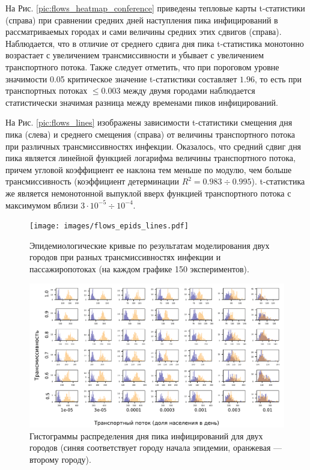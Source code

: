 \documentclass[a4paper,12pt]{article} %
\begin{document}
На Рис. \ref{pic:flows_heatmap_conference} приведены тепловые карты t-статистики (справа) при сравнении средних дней наступления пика инфицирований в рассматриваемых городах и сами величины средних этих сдвигов (справа). Наблюдается, что в отличие от среднего сдвига дня пика t-статистика монотонно возрастает с увеличением трансмиссивности и убывает с увеличением транспортного потока. Также следует отметить, что при пороговом уровне значимости 0.05 критическое значение t-статистики составляет $1.96$, то есть при транспортных потоках $\leqslant 0.003$ между двумя городами наблюдается статистически значимая разница между временами пиков инфицирований.

На Рис. \ref{pic:flows_lines} изображены зависимости t-статистики смещения дня пика (слева) и среднего смещения (справа) от величины транспортного потока при различных трансмиссивностях инфекции. Оказалось, что средний сдвиг дня пика является линейной функцией логарифма величины транспортного потока, причем угловой коэффициент ее наклона тем меньше по модулю, чем больше трансмиссивность (коэффициент детерминации $R^2 = 0.983\div 0.995$). t-статистика же является немонотонной выпуклой вверх функцией транспортного потока с максимумом вблизи $3\cdot 10^{-5}\div 10^{-4}$.

\begin{figure}[H]
    \centering
    \texttt{[image: images/flows\_epids\_lines.pdf]}
    \caption{Эпидемиологические кривые по результатам моделирования двух городов при разных трансмиссивностях инфекции и пассажиропотоках (на каждом графике 150 экспериментов).}
    \label{pic:flows_epids_lines}
\end{figure}

\begin{figure}[H]
    \centering
    \includegraphics[width=\linewidth]{images/flows_hists_day.pdf}
    \caption{Гистограммы распределения дня пика инфицирований для двух городов (синяя соответствует городу начала эпидемии, оранжевая --- второму городу).}
    \label{pic:flows_hists_day}
\end{figure}
\end{document}
